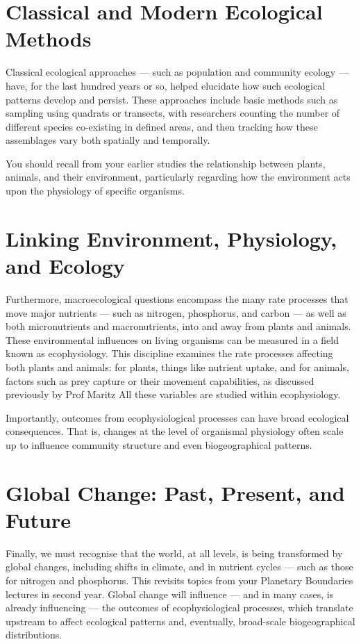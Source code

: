 \documentclass[
  12pt,
]{book}
\begin{document}
\section{Classical and Modern Ecological
Methods}\label{classical-and-modern-ecological-methods}

Classical ecological approaches --- such as population and community
ecology --- have, for the last hundred years or so, helped elucidate how
such ecological patterns develop and persist. These approaches include
basic methods such as sampling using quadrats or transects, with
researchers counting the number of different species co-existing in
defined areas, and then tracking how these assemblages vary both
spatially and temporally.

You should recall from your earlier studies the relationship between
plants, animals, and their environment, particularly regarding how the
environment acts upon the physiology of specific organisms.

\section{Linking Environment, Physiology, and
Ecology}\label{linking-environment-physiology-and-ecology}

Furthermore, macroecological questions encompass the many rate processes
that move major nutrients --- such as nitrogen, phosphorus, and carbon
--- as well as both micronutrients and macronutrients, into and away
from plants and animals. These environmental influences on living
organisms can be measured in a field known as ecophysiology. This
discipline examines the rate processes affecting both plants and
animals: for plants, things like nutrient uptake, and for animals,
factors such as prey capture or their movement capabilities, as
discussed previously by Prof Maritz All these variables are studied
within ecophysiology.

Importantly, outcomes from ecophysiological processes can have broad
ecological consequences. That is, changes at the level of organismal
physiology often scale up to influence community structure and even
biogeographical patterns.

\section{Global Change: Past, Present, and
Future}\label{global-change-past-present-and-future}

Finally, we must recognise that the world, at all levels, is being
transformed by global changes, including shifts in climate, and in
nutrient cycles --- such as those for nitrogen and phosphorus. This
revisits topics from your Planetary Boundaries lectures in second year.
Global change will influence --- and in many cases, is already
influencing --- the outcomes of ecophysiological processes, which
translate upstream to affect ecological patterns and, eventually,
broad-scale biogeographical distributions.
\end{document}
